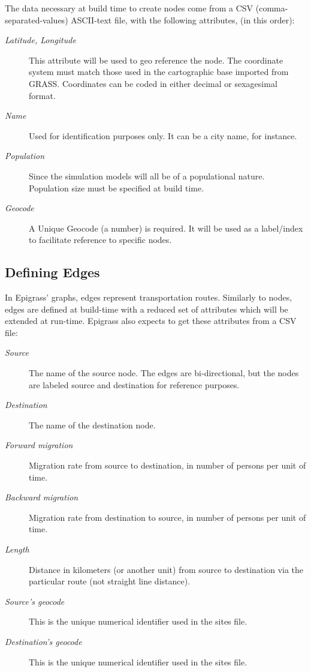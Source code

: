 \documentclass[a4paper,10pt]{manual}
\begin{document}
The data necessary at build time to create nodes come from a CSV (comma-separated-values) ASCII-text file, with the following attributes, (in this order):
\begin{description}
\item[\emph{Latitude, Longitude}]
This attribute will be used to geo reference the  node. The coordinate system must match those used in the cartographic base imported from GRASS. Coordinates can be coded in either decimal or sexagesimal format.

\item[\emph{Name}]
Used for identification purposes only. It can be a city name, for instance.

\item[\emph{Population}]
Since the simulation models will all be of a populational nature. Population size must be specified at build time.

\item[\emph{Geocode}]
A Unique Geocode (a number) is required. It will be used as a label/index to facilitate  reference to specific nodes.

\end{description}


\subsection{Defining Edges}

In Epigrass' graphs, edges represent transportation routes. Similarly to nodes, edges are defined at build-time with a reduced set of attributes which will be extended at run-time. Epigrass also expects to get these attributes from a CSV file:
\begin{description}
\item[\emph{Source}]
The name of the source node. The edges are bi-directional, but the nodes are labeled source and destination for reference purposes.

\item[\emph{Destination}]
The name of the destination node.

\item[\emph{Forward migration}]
Migration rate from source to destination, in number of persons per unit of time.

\item[\emph{Backward migration}]
Migration rate from destination to source, in number of persons per unit of time.

\item[\emph{Length}]
Distance in kilometers (or another unit) from source to destination via the particular route (not straight line distance).

\item[\emph{Source's geocode}]
This is the unique numerical identifier used in the sites file.

\item[\emph{Destination's geocode}]
This is the unique numerical identifier used in the sites file.

\end{description}
\end{document}
